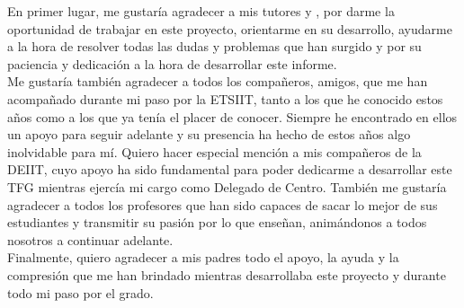 En primer lugar, me gustaría agradecer a mis tutores {\myProf} y {\myOtherProf}, por darme la oportunidad de trabajar en este proyecto, orientarme en su desarrollo, ayudarme a la hora de resolver todas las dudas y problemas que han surgido y por su paciencia y dedicación a la hora de desarrollar este informe.\\

Me gustaría también agradecer a todos los compañeros, amigos, que me han acompañado durante mi paso por la ETSIIT, tanto a los que he conocido estos años como a los que ya tenía el placer de conocer. Siempre he encontrado en ellos un apoyo para seguir adelante y su presencia ha hecho de estos años algo inolvidable para mí. Quiero hacer especial mención a mis compañeros de la DEIIT, cuyo apoyo ha sido fundamental para poder dedicarme a desarrollar este TFG mientras ejercía mi cargo como Delegado de Centro. También me gustaría agradecer a todos los profesores que han sido capaces de sacar lo mejor de sus estudiantes y transmitir su pasión por lo que enseñan, animándonos a todos nosotros a continuar adelante.\\

Finalmente, quiero agradecer a mis padres todo el apoyo, la ayuda y la compresión que me han brindado mientras desarrollaba este proyecto y durante todo mi paso por el grado. 